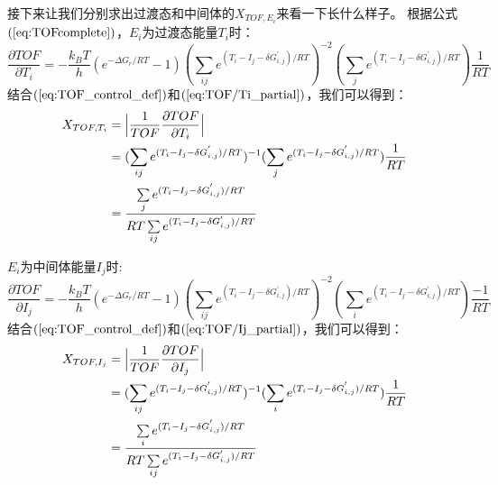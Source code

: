 \documentclass[a4paper,titlepage]{article}
\newcommand{\bigabs}[1]{\Bigl \lvert #1 \Bigr \rvert}
\begin{document}
接下来让我们分别求出过渡态和中间体的$X_{TOF,E_i}$来看一下长什么样子。
根据公式$(\ref{eq:TOFcomplete})$，$E_i$为过渡态能量$T_i$时：
\begin{equation}\label{eq:TOF/Ti_partial}
  \frac{\partial{TOF}}{\partial{T_i}} =
    -\frac{k_BT}{h}
    (e^{-\Delta{G}_r/RT}-1)
    (\sum\limits_{ij}e^{(T_i-I_j-\delta{G}_{i,j}^{'})/RT})^{-2}
    (\sum\limits_{j}e^{(T_i-I_j-\delta{G}_{i,j}^{'})/RT})
    \frac{1}{RT}
\end{equation}
结合$(\ref{eq:TOF_control_def})$和$(\ref{eq:TOF/Ti_partial})$，我们可以得到：
\begin{equation}\label{eq:TOF_Ti_withRT}
\begin{split}
X_{TOF,T_i}
  &= \bigabs{
      \frac{1}{TOF}\frac{\partial{TOF}}{\partial{T_i}}
      } \\
  &= (\sum\limits_{ij}e^{(T_i-I_j-\delta{G}_{i,j}^{'})/RT})^{-1}
      (\sum\limits_{j}e^{(T_i-I_j-\delta{G}_{i,j}^{'})/RT})
      \frac{1}{RT} \\
  &= \frac
{\sum\limits_{j}e^{(T_i-I_j-\delta{G}_{i,j}^{'})/RT}}
{RT\sum\limits_{ij}e^{(T_i-I_j-\delta{G}_{i,j}^{'})/RT}}
\end{split}
\end{equation}

$E_i$为中间体能量$I_j$时:
\begin{equation}\label{eq:TOF/Ij_partial}
  \frac{\partial{TOF}}{\partial{I_j}} =
    -\frac{k_BT}{h}
    (e^{-\Delta{G}_r/RT}-1)
    (\sum\limits_{ij}e^{(T_i-I_j-\delta{G}_{i,j}^{'})/RT})^{-2}
    (\sum\limits_{i}e^{(T_i-I_j-\delta{G}_{i,j}^{'})/RT})
    \frac{-1}{RT}
\end{equation}
结合$(\ref{eq:TOF_control_def})$和$(\ref{eq:TOF/Ij_partial})$，我们可以得到：
\begin{equation}\label{eq:TOF_Ij_withRT}
\begin{split}
X_{TOF,I_j}
  &= \bigabs{
      \frac{1}{TOF}\frac{\partial{TOF}}{\partial{I_j}}
      } \\
  &= (\sum\limits_{ij}e^{(T_i-I_j-\delta{G}_{i,j}^{'})/RT})^{-1}
      (\sum\limits_{i}e^{(T_i-I_j-\delta{G}_{i,j}^{'})/RT})
      \frac{1}{RT} \\
  &= \frac
{\sum\limits_{i}e^{(T_i-I_j-\delta{G}_{i,j}^{'})/RT}}
{RT\sum\limits_{ij}e^{(T_i-I_j-\delta{G}_{i,j}^{'})/RT}}
\end{split}
\end{equation}
\end{document}
